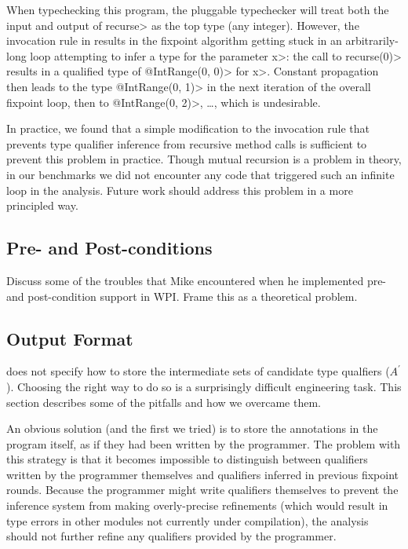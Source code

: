 When typechecking this program, the pluggable typechecker will
treat both the input and output of \<recurse> as the top type
(\ie any integer). However, the invocation rule in 
results in the fixpoint algorithm getting stuck in an arbitrarily-long
loop attempting to infer a type for the parameter \<x>: the call to \<recurse(0)>
results in a qualified type of \<@IntRange(0, 0)> for \<x>. Constant
propagation then leads to the type \<@IntRange(0, 1)> in the next iteration
of the overall fixpoint loop, then to \<@IntRange(0, 2)>, \ldots, which
is undesirable.

In practice, we found that a simple modification to the invocation rule that
prevents type qualifier inference from recursive method calls is sufficient
to prevent this problem in practice.
 Though mutual recursion is a problem in
theory, in our benchmarks we did not encounter any code that triggered such
an infinite loop in the analysis. Future work should address this problem in
a more principled way.

\subsection{Pre- and Post-conditions}
\label{sec:pre-post-conditions}

Discuss some of the troubles that Mike encountered when
he implemented pre- and post-condition support in WPI. Frame
this as a theoretical problem. 

\subsection{Output Format}
\label{sec:output}


 does not specify how to store the intermediate
sets of candidate type qualfiers (\ie $A^{\prime}$). Choosing the right way
to do so is a surprisingly difficult engineering task. This section describes some
of the pitfalls and how we overcame them.

An obvious solution (and the first we tried) is to store the annotations
in the program itself, as if they had been written by the programmer. The
problem with this strategy is that it becomes impossible to distinguish
between qualifiers written by the programmer themselves and qualifiers
inferred in previous fixpoint rounds. Because the programmer might write
qualifiers themselves to prevent the inference system from making overly-precise
refinements (which would result in type errors in \eg other modules not currently
under compilation), the analysis should not further refine any qualifiers
provided by the programmer.

